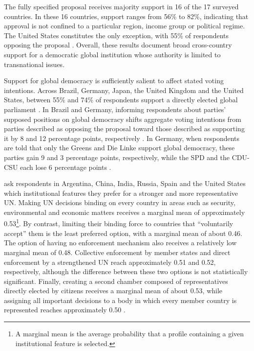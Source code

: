 \documentclass[11pt,a4paper]{article}
\begin{document}
The fully specified proposal receives majority support in 16 of the 17 surveyed countries. In these 16 countries, support ranges from 56\% to 82\%, indicating that approval is not confined to a particular region, income group or political regime. The United States constitutes the only exception, with 55\% of respondents opposing the proposal \citep[Figure 6]{ghassim_who_2024}. Overall, these results document broad cross-country support for a democratic global institution whose authority is limited to transnational issues.

Support for global democracy is sufficiently salient to affect stated voting intentions. Across Brazil, Germany, Japan, the United Kingdom and the United States, between 55\% and 74\% of respondents support a directly elected global parliament \citep[Figure 7]{ghassim_global_democracy_2020}. In Brazil and Germany, informing respondents about parties' supposed positions on global democracy shifts aggregate voting intentions from parties described as opposing the proposal toward those described as supporting it by 8 and 12 percentage points, respectively \citep[Figures 144--145]{ghassim_global_democracy_2020}. In Germany, when respondents are told that only the Greens and Die Linke support global democracy, these parties gain 9 and 3 percentage points, respectively, while the SPD and the CDU-CSU each lose 6 percentage points \citep[Figure 145]{ghassim_global_democracy_2020}.

\citet{ghassim_public_2022} ask respondents in Argentina, China, India, Russia, Spain and the United States which institutional features they prefer for a stronger and more representative UN. Making UN decisions binding on every country in areas such as security, environmental and economic matters receives a marginal mean of approximately 0.53\footnote{A marginal mean is the average probability that a profile containing a given institutional feature is selected.}. 
By contrast, limiting their binding force to countries that ``voluntarily accept'' them is the least preferred option, with a marginal mean of about 0.46. The option of having no enforcement mechanism also receives a relatively low marginal mean of 0.48. Collective enforcement by member states and direct enforcement by a strengthened UN reach approximately 0.51 and 0.52, respectively, although the difference between these two options is not statistically significant. Finally, creating a second chamber composed of representatives directly elected by citizens receives a marginal mean of about 0.53, while assigning all important decisions to a body in which every member country is represented reaches approximately 0.50 \citep[Figure 1]{ghassim_public_2022}.
\end{document}
